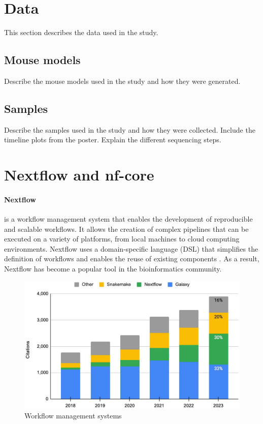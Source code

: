 \section{Data}
This section describes the data used in the study.

\subsection{Mouse models}
Describe the mouse models used in the study and how they were generated.

\subsection{Samples}
Describe the samples used in the study and how they were collected.
Include the timeline plots from the poster.
Explain the different sequencing steps.

\section{Nextflow and nf-core}
\paragraph{Nextflow} is a workflow management system that enables the
development of reproducible and scalable workflows. It allows the creation of
complex pipelines that can be executed on a variety of platforms, from local
machines to cloud computing environments. Nextflow uses a domain-specific
language (DSL) that simplifies the definition of workflows and enables the reuse
of existing components \supercite{di_tommaso_nextflow_2017}. As a result,
Nextflow has become a popular tool in the bioinformatics community.

\begin{figure}[ht]
    \centering
    \includegraphics[width=\textwidth]{chapters/materials_and_methods/figures/nextflow_usage.jpg}
    \caption{Workflow management systems} %
    \label{fig:nextflow_usage}
\end{figure}

